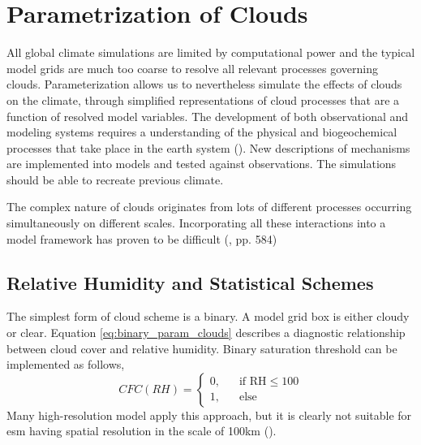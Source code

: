 \section{Parametrization of Clouds} \label{sec:param_clouds}
All global climate simulations are limited by computational power and the typical model grids are much too coarse to resolve all relevant processes governing clouds. Parameterization allows us to nevertheless simulate the effects of clouds on the climate, through simplified representations of cloud processes that are a function of resolved model variables. The development of both observational and modeling systems requires a understanding of the physical and biogeochemical processes that take place in the earth system (\cite{Simmons2016Observation2016-2025}). New descriptions of mechanisms are implemented into models and tested against observations. The simulations should be able to recreate previous climate. 

The complex nature of clouds originates from lots of different processes occurring simultaneously on different scales. Incorporating all these interactions into a model framework has proven to be difficult (\cite{IPCC_CH7_clouds}, pp. 584)

\subsection{Relative Humidity and Statistical Schemes}
The simplest form of cloud scheme is a binary. A model grid box is either cloudy or clear. Equation \eqref{eq:binary_param_clouds} describes a diagnostic relationship between cloud cover and relative humidity. Binary saturation threshold can be implemented as follows,
\begin{equation} \label{eq:binary_param_clouds}
    CFC\left(RH\right) = 
     \begin{cases}
       \text{0,} &\quad\text{if RH}\le100\\
       \text{1,} &\quad\text{else}
     \end{cases}
\end{equation}
Many high-resolution model apply this approach, but it is clearly not suitable for \acrshort{esm} having spatial resolution in the scale of 100km (\cite{Tomkins2005}).

